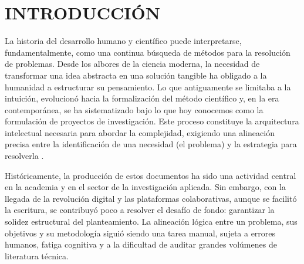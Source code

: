 \documentclass[12pt,letterpaper]{article}
\begin{document}
\setcounter{page}{3} %

\makeatletter
\renewcommand{\cftdotsep}{10000} %
\makeatother

\setlength{\cftfigindent}{0pt} %
\setlength{\cfttabindent}{0pt} %

\newpage
\noindent\renewcommand{\contentsname}{\textbf{CONTENIDO}} %
\vspace{-1cm}
\textbf{\tableofcontents}

\newpage
\section*{INTRODUCCIÓN}
\vspace{-0.5cm}

La historia del desarrollo humano y científico puede interpretarse, fundamentalmente, como una continua búsqueda de métodos para la resolución de problemas. Desde los albores de la ciencia moderna, la necesidad de transformar una idea abstracta en una solución tangible ha obligado a la humanidad a estructurar su pensamiento. Lo que antiguamente se limitaba a la intuición, evolucionó hacia la formalización del método científico y, en la era contemporánea, se ha sistematizado bajo lo que hoy conocemos como la formulación de proyectos de investigación. Este proceso constituye la arquitectura intelectual necesaria para abordar la complejidad, exigiendo una alineación precisa entre la identificación de una necesidad (el problema) y la estrategia para resolverla \citep{Miles2019}.

Históricamente, la producción de estos documentos ha sido una actividad central en la academia y en el sector de la investigación aplicada. Sin embargo, con la llegada de la revolución digital y las plataformas colaborativas, aunque se facilitó la escritura, se contribuyó poco a resolver el desafío de fondo: garantizar la solidez estructural del planteamiento. La alineación lógica entre un problema, sus objetivos y su metodología \citep{Covvey2023} siguió siendo una tarea manual, sujeta a errores humanos, fatiga cognitiva y a la dificultad de auditar grandes volúmenes de literatura técnica.
\end{document}
